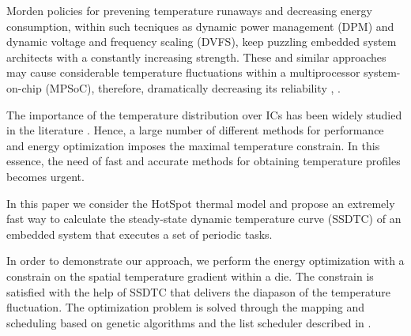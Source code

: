 Morden policies for prevening temperature runaways and decreasing energy consumption, within such tecniques as dynamic power management (DPM) and dynamic voltage and frequency scaling (DVFS), keep puzzling embedded system architects with a constantly increasing strength. These and similar approaches may cause considerable temperature fluctuations within a multiprocessor system-on-chip (MPSoC), therefore, dramatically decreasing its reliability \cite{mihic2004}, \cite{simunic2005}.

The importance of the temperature distribution over ICs has been widely studied in the literature \cite{lu2004}. Hence, a large number of different methods for performance and energy optimization imposes the maximal temperature constrain. In this essence, the need of fast and accurate methods for obtaining temperature profiles becomes urgent.

In this paper we consider the HotSpot thermal model \cite{huang2006} and propose an extremely fast way to calculate the steady-state dynamic temperature curve (SSDTC) of an embedded system that executes a set of periodic tasks.

In order to demonstrate our approach, we perform the energy optimization with a constrain on the spatial temperature gradient within a die. The constrain is satisfied with the help of SSDTC that delivers the diapason of the temperature fluctuation. The optimization problem is solved through the mapping and scheduling based on genetic algorithms and the list scheduler described in \cite{schmitz2004}.
